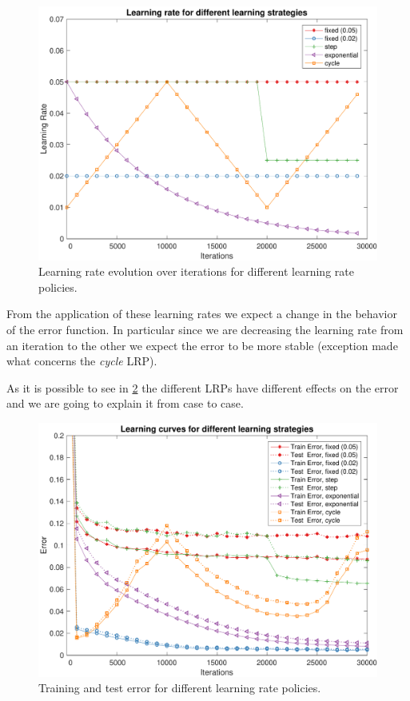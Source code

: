 \begin{figure}
	\centering
	\includegraphics[width=\columnwidth]{figures/learning_rates}
	\caption{Learning rate evolution over iterations for different learning rate policies.}
	\label{fig:learning_rates_policies}
\end{figure}

From the application of these learning rates we expect a change in the behavior of the error function. In particular
since we are decreasing the learning rate from an iteration to the other we expect the error to be more stable (exception made what
concerns the \textit{cycle} LRP).

As it is possible to see in \cref{fig:lrp_training_error} the different LRPs have different
effects on the error and we are going to explain it from case to case.

\begin{figure}
	\centering
	\includegraphics[width=\columnwidth]{figures/error_strategies.pdf}
	\caption{Training and test error for different learning rate policies.}
	\label{fig:lrp_training_error}
\end{figure}

